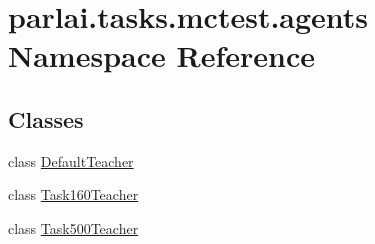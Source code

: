 \hypertarget{namespaceparlai_1_1tasks_1_1mctest_1_1agents}{}\section{parlai.\+tasks.\+mctest.\+agents Namespace Reference}
\label{namespaceparlai_1_1tasks_1_1mctest_1_1agents}
\subsection*{Classes}
\begin{DoxyCompactItemize}
\item 
class \hyperlink{classparlai_1_1tasks_1_1mctest_1_1agents_1_1DefaultTeacher}{Default\+Teacher}
\item 
class \hyperlink{classparlai_1_1tasks_1_1mctest_1_1agents_1_1Task160Teacher}{Task160\+Teacher}
\item 
class \hyperlink{classparlai_1_1tasks_1_1mctest_1_1agents_1_1Task500Teacher}{Task500\+Teacher}
\end{DoxyCompactItemize}
